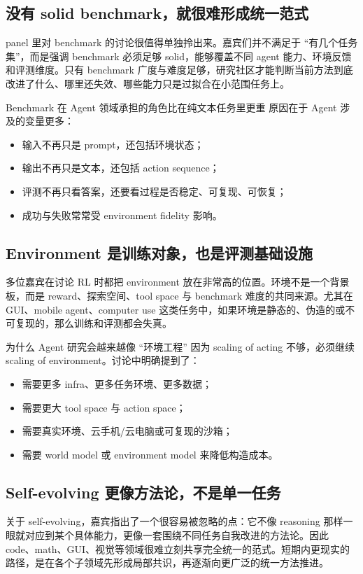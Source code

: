 \documentclass[a4paper]{article}
\begin{document}
\subsection{没有 solid benchmark，就很难形成统一范式}
panel 里对 benchmark 的讨论很值得单独拎出来。嘉宾们并不满足于 ``有几个任务集''，而是强调 benchmark 必须足够 solid，能够覆盖不同 agent 能力、环境反馈和评测维度。只有 benchmark 广度与难度足够，研究社区才能判断当前方法到底改进了什么、哪里还失效、哪些能力只是过拟合在小范围任务上。

\begin{importantbox}{Benchmark 在 Agent 领域承担的角色比在纯文本任务里更重}
原因在于 Agent 涉及的变量更多：
\begin{itemize}
  \item 输入不再只是 prompt，还包括环境状态；
  \item 输出不再只是文本，还包括 action sequence；
  \item 评测不再只看答案，还要看过程是否稳定、可复现、可恢复；
  \item 成功与失败常常受 environment fidelity 影响。
\end{itemize}
\end{importantbox}

\subsection{Environment 是训练对象，也是评测基础设施}
多位嘉宾在讨论 RL 时都把 environment 放在非常高的位置。环境不是一个背景板，而是 reward、探索空间、tool space 与 benchmark 难度的共同来源。尤其在 GUI、mobile agent、computer use 这类任务中，如果环境是静态的、伪造的或不可复现的，那么训练和评测都会失真。

\begin{knowledgebox}{为什么 Agent 研究会越来越像 ``环境工程''}
因为 scaling of acting 不够，必须继续 scaling of environment。讨论中明确提到了：
\begin{itemize}
  \item 需要更多 infra、更多任务环境、更多数据；
  \item 需要更大 tool space 与 action space；
  \item 需要真实环境、云手机/云电脑或可复现的沙箱；
  \item 需要 world model 或 environment model 来降低构造成本。
\end{itemize}
\end{knowledgebox}

\subsection{Self-evolving 更像方法论，不是单一任务}
关于 self-evolving，嘉宾指出了一个很容易被忽略的点：它不像 reasoning 那样一眼就对应到某个具体能力，更像一套围绕不同任务自我改进的方法论。因此 code、math、GUI、视觉等领域很难立刻共享完全统一的范式。短期内更现实的路径，是在各个子领域先形成局部共识，再逐渐向更广泛的统一方法推进。
\end{document}
